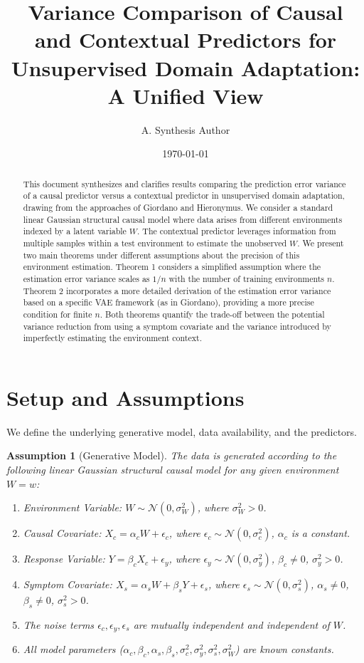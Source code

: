 \documentclass[11pt]{article}
\title{Variance Comparison of Causal and Contextual Predictors for Unsupervised Domain Adaptation: A Unified View}
\author{A. Synthesis Author}
\date{\today}
\newtheorem{assumption}{Assumption}[section]
\newcommand{\N}{\mathcal{N}}
\begin{document}
\maketitle

\begin{abstract}
This document synthesizes and clarifies results comparing the prediction error variance of a causal predictor versus a contextual predictor in unsupervised domain adaptation, drawing from the approaches of Giordano and Hieronymus. We consider a standard linear Gaussian structural causal model where data arises from different environments indexed by a latent variable $W$. The contextual predictor leverages information from multiple samples within a test environment to estimate the unobserved $W$. We present two main theorems under different assumptions about the precision of this environment estimation. Theorem 1 considers a simplified assumption where the estimation error variance scales as $1/n$ with the number of training environments $n$. Theorem 2 incorporates a more detailed derivation of the estimation error variance based on a specific VAE framework (as in Giordano), providing a more precise condition for finite $n$. Both theorems quantify the trade-off between the potential variance reduction from using a symptom covariate and the variance introduced by imperfectly estimating the environment context.
\end{abstract}

\section{Setup and Assumptions}

We define the underlying generative model, data availability, and the predictors.

\begin{assumption}[Generative Model]
The data is generated according to the following linear Gaussian structural causal model for any given environment $W=w$:
\begin{enumerate}
    \item Environment Variable: $W \sim \N(0, \sigma_W^2)$, where $\sigma_W^2 > 0$.
    \item Causal Covariate: $X_c = \alpha_c W + \epsilon_c$, where $\epsilon_c \sim \N(0, \sigma_c^2)$, $\alpha_c$ is a constant.
    \item Response Variable: $Y = \beta_c X_c + \epsilon_y$, where $\epsilon_y \sim \N(0, \sigma_y^2)$, $\beta_c \neq 0$, $\sigma_y^2 > 0$.
    \item Symptom Covariate: $X_s = \alpha_s W + \beta_s Y + \epsilon_s$, where $\epsilon_s \sim \N(0, \sigma_s^2)$, $\alpha_s \neq 0$, $\beta_s \neq 0$, $\sigma_s^2 > 0$.
    \item The noise terms $\epsilon_c, \epsilon_y, \epsilon_s$ are mutually independent and independent of $W$.
    \item All model parameters ($\alpha_c, \beta_c, \alpha_s, \beta_s, \sigma_c^2, \sigma_y^2, \sigma_s^2, \sigma_W^2$) are known constants.
\end{enumerate}
\end{assumption}
\end{document}
